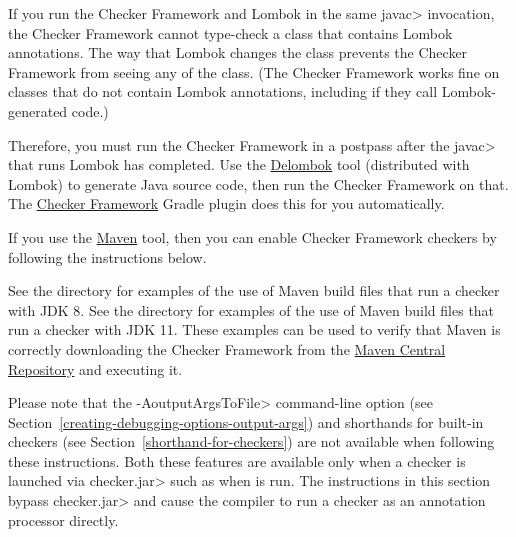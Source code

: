 


If you run the Checker Framework and Lombok in the same \<javac>
invocation, the Checker Framework cannot type-check a class that contains
Lombok annotations.  The way that Lombok changes the class prevents the
Checker Framework from seeing any of the class.  (The Checker Framework
works fine on classes that do not contain Lombok annotations, including if
they call Lombok-generated code.)

Therefore, you must run the Checker Framework in a postpass after the
\<javac> that runs Lombok has completed.  Use the
\href{https://projectlombok.org/features/delombok}{Delombok} tool
(distributed with Lombok) to generate Java source code, then run the
Checker Framework on that.  The
\href{https://github.com/kelloggm/checkerframework-gradle-plugin}{Checker Framework}
Gradle plugin does this for you automatically.



If you use the \href{http://maven.apache.org/}{Maven} tool,
then you can enable Checker Framework checkers by following the
instructions below.

See the directory  for examples of the use of
Maven build files that run a checker with JDK 8.
See the directory  for examples of the use of
Maven build files that run a checker with JDK 11.
These examples can be used to verify that
Maven is correctly downloading the Checker Framework from the
\href{https://search.maven.org/search?q=org.checkerframework}{Maven
  Central Repository} and executing it.

Please note that the \<-AoutputArgsToFile> command-line option
(see Section~\ref{creating-debugging-options-output-args}) and shorthands for built-in checkers
(see Section~\ref{shorthand-for-checkers}) are not available when
following these instructions.  Both these features are available only when a checker is
launched via \<checker.jar> such as when 
is run.  The instructions in this section
bypass \<checker.jar> and cause the compiler to run a
checker as an annotation processor directly.

